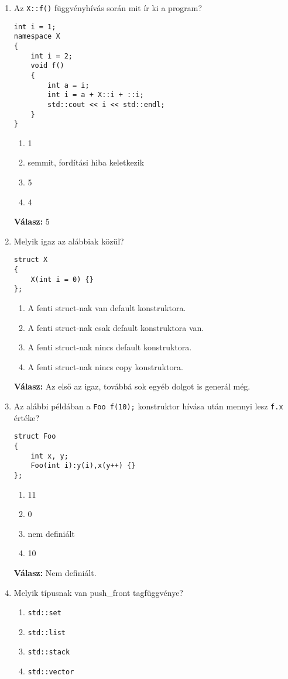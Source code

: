 \documentclass[a4paper,11.5pt,table]{article}
\begin{document}
\begin{enumerate}[1.)]
		\item Az \texttt{X::f()} függvényhívás során mit ír ki a program?
		\begin{lstlisting}
int i = 1;
namespace X
{
	int i = 2;
	void f()
	{
		int a = i;
		int i = a + X::i + ::i;
		std::cout << i << std::endl;
	}
}
		\end{lstlisting}
		\begin{enumerate}
			\item 1
			\item semmit, fordítási hiba keletkezik
			\item 5
			\item 4
		\end{enumerate}
		\textbf{Válasz:} 5
		\item Melyik igaz az alábbiak közül?
		\begin{lstlisting}
struct X
{
	X(int i = 0) {}
};
		\end{lstlisting}
		\begin{enumerate}
			\item A fenti struct-nak van default konstruktora.
			\item A fenti struct-nak csak default konstruktora van.
			\item A fenti struct-nak nincs default konstruktora.
			\item A fenti struct-nak nincs copy konstruktora.
		\end{enumerate}
		\textbf{Válasz:} Az első az igaz, továbbá sok egyéb dolgot is generál még.
		\item Az alábbi példában a \texttt{Foo f(10);} konstruktor hívása után mennyi lesz \texttt{f.x} értéke?
		\begin{lstlisting}
struct Foo
{
	int x, y;
	Foo(int i):y(i),x(y++) {}
};
		\end{lstlisting}
		\begin{enumerate}
			\item 11
			\item 0
			\item nem definiált
			\item 10
		\end{enumerate}
		\textbf{Válasz:} Nem definiált.
		\item Melyik típusnak van push\_front tagfüggvénye?
		\begin{enumerate}
			\item \texttt{std::set}
			\item \texttt{std::list}
			\item \texttt{std::stack}
			\item \texttt{std::vector}

\end{enumerate}
\end{enumerate}
\end{document}
